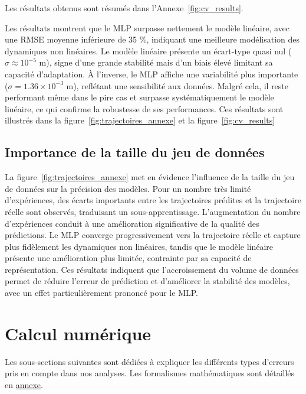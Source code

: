 \documentclass[
	a4paper, %
	10pt, %
	unnumberedsections, %
	twoside, %
]{LTJournalArticle}
\begin{document}
Les résultats obtenus sont résumés dans l'Annexe~\ref{fig:cv_results}.

Les résultats montrent que le MLP surpasse nettement le modèle linéaire, avec une RMSE moyenne inférieure de 35 \%,
indiquant une meilleure modélisation des dynamiques non linéaires. Le modèle linéaire présente un écart-type quasi nul ($\sigma \approx 10^{-5}$ m),
signe d’une grande stabilité mais d’un biais élevé limitant sa capacité d’adaptation.
À l’inverse, le MLP affiche une variabilité plus importante ($\sigma = 1.36 \times 10^{-3}$ m),
reflétant une sensibilité aux données. Malgré cela,
il reste performant même dans le pire cas et surpasse systématiquement le modèle linéaire, ce qui confirme la robustesse de ses performances.
Ces résultats sont illustrés dans la figure~\ref{fig:trajectoires_annexe} et la figure~\ref{fig:cv_results}

\subsection{Importance de la taille du jeu de données}

La figure~\ref{fig:trajectoires_annexe} met en évidence l’influence de la taille du jeu de données sur la précision des modèles. 
Pour un nombre très limité d’expériences, des écarts importants entre les trajectoires prédites et la trajectoire réelle sont observés, 
traduisant un sous-apprentissage.
L’augmentation du nombre d’expériences conduit à une amélioration significative de la qualité des prédictions. 
Le MLP converge progressivement vers la trajectoire réelle et capture plus fidèlement les dynamiques non linéaires, 
tandis que le modèle linéaire présente une amélioration plus limitée, contrainte par sa capacité de représentation.
Ces résultats indiquent que l’accroissement du volume de données permet de réduire l’erreur de prédiction et d’améliorer la stabilité des modèles, 
avec un effet particulièrement prononcé pour le MLP.


\section{Calcul numérique} \label{sec:calcnum}

Les sous-sections suivantes sont dédiées à expliquer les différents types
d'erreurs pris en compte dans nos analyses. Les formalismes mathématiques
sont détaillés en \hyperref[annex:numerrors]{annexe}.
\end{document}
